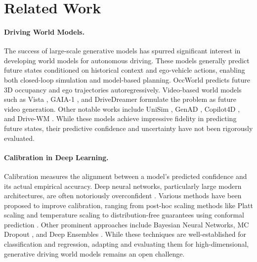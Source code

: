 \section{Related Work}
\label{sec:related}

\paragraph{Driving World Models.}
The success of large-scale generative models has spurred significant interest in developing world models for autonomous driving. These models generally predict future states conditioned on historical context and ego-vehicle actions, enabling both closed-loop simulation and model-based planning. OccWorld \cite{zheng2024occworld} predicts future 3D occupancy and ego trajectories autoregressively. Video-based world models such as Vista \cite{gao2024vista}, GAIA-1 \cite{hu2023gaia1}, and DriveDreamer \cite{wang2023drivedreamer} formulate the problem as future video generation. Other notable works include UniSim \cite{yang2023unisim}, GenAD \cite{zheng2024genad}, Copilot4D \cite{zhang2024copilot4d}, and Drive-WM \cite{wang2024drivewm}. While these models achieve impressive fidelity in predicting future states, their predictive confidence and uncertainty have not been rigorously evaluated.

\paragraph{Calibration in Deep Learning.}
Calibration measures the alignment between a model's predicted confidence and its actual empirical accuracy. Deep neural networks, particularly large modern architectures, are often notoriously overconfident \cite{guo2017calibration}. Various methods have been proposed to improve calibration, ranging from post-hoc scaling methods like Platt scaling \cite{platt1999probabilistic} and temperature scaling \cite{guo2017calibration} to distribution-free guarantees using conformal prediction \cite{vovk2005algorithmic, romano2019conformal}. Other prominent approaches include Bayesian Neural Networks, MC Dropout \cite{gal2016dropout}, and Deep Ensembles \cite{lakshminarayanan2017simple}. While these techniques are well-established for classification and regression, adapting and evaluating them for high-dimensional, generative driving world models remains an open challenge.

